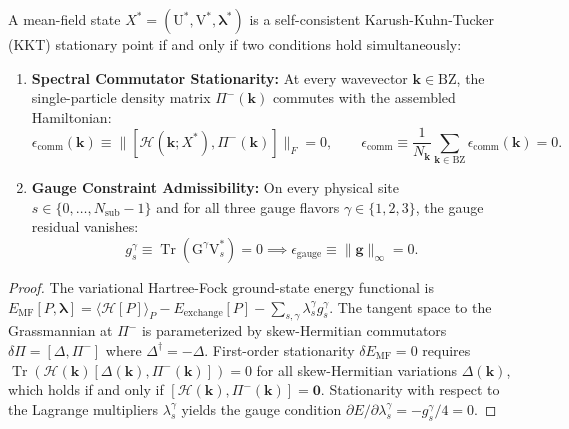 \begin{theorem}
\label{thm:m1_6_kkt_condition}
A mean-field state $X^* = (\mathrm{U}^*, \mathrm{V}^*, \boldsymbol{\lambda}^*)$ is a self-consistent Karush-Kuhn-Tucker (KKT) stationary point if and only if two conditions hold simultaneously:
\begin{enumerate}
\item \textbf{Spectral Commutator Stationarity:} At every wavevector $\mathbf{k} \in \mathrm{BZ}$, the single-particle density matrix $\Pi^-(\mathbf{k})$ commutes with the assembled Hamiltonian:
\begin{equation}
\label{eq:m1_6_kkt_comm}
\epsilon_{\mathrm{comm}}(\mathbf{k}) \equiv \| [\mathcal{H}(\mathbf{k}; X^*), \Pi^-(\mathbf{k})] \|_F = 0, \qquad \epsilon_{\mathrm{comm}} \equiv \frac{1}{N_{\mathbf{k}}} \sum_{\mathbf{k} \in \mathrm{BZ}} \epsilon_{\mathrm{comm}}(\mathbf{k}) = 0.
\end{equation}
\item \textbf{Gauge Constraint Admissibility:} On every physical site $s \in \{0, \dots, N_{\mathrm{sub}}-1\}$ and for all three gauge flavors $\gamma \in \{1, 2, 3\}$, the gauge residual vanishes:
\begin{equation}
\label{eq:m1_6_gauge_condition}
g_s^\gamma \equiv \operatorname{Tr}(\mathrm{G}^\gamma \mathrm{V}_s^*) = 0 \implies \epsilon_{\mathrm{gauge}} \equiv \|\mathbf{g}\|_\infty = 0.
\end{equation}
\end{enumerate}
\end{theorem}
\begin{proof}
The variational Hartree-Fock ground-state energy functional is $E_{\mathrm{MF}}[P, \boldsymbol{\lambda}] = \langle \mathcal{H}[P] \rangle_P - E_{\mathrm{exchange}}[P] - \sum_{s,\gamma} \lambda_s^\gamma g_s^\gamma$. The tangent space to the Grassmannian at $\Pi^-$ is parameterized by skew-Hermitian commutators $\delta \Pi = [\Delta, \Pi^-]$ where $\Delta^\dagger = -\Delta$. First-order stationarity $\delta E_{\mathrm{MF}} = 0$ requires $\operatorname{Tr}(\mathcal{H}(\mathbf{k}) [\Delta(\mathbf{k}), \Pi^-(\mathbf{k})]) = 0$ for all skew-Hermitian variations $\Delta(\mathbf{k})$, which holds if and only if $[\mathcal{H}(\mathbf{k}), \Pi^-(\mathbf{k})] = \mathbf{0}$. Stationarity with respect to the Lagrange multipliers $\lambda_s^\gamma$ yields the gauge condition $\partial E / \partial \lambda_s^\gamma = -g_s^\gamma / 4 = 0$.
\end{proof}

